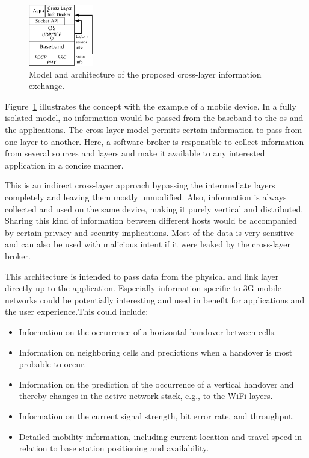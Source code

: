 \begin{figure}[htb]
	\centering
	\includegraphics[width=0.25\textwidth]{images/cross-layer-model.pdf}
	\caption{Model and architecture of the proposed cross-layer information exchange.}
\label{c5:fig:crosslayer-model}
\end{figure}

Figure~\ref{c5:fig:crosslayer-model} illustrates the concept with the example of a mobile device. In a fully isolated model, no information would be passed from the baseband to the \gls{os} and the applications. The cross-layer model permits certain information to pass from one layer to another. Here, a software broker is responsible to collect information from several sources and layers and make it available to any interested application in a concise manner. 

This is an indirect cross-layer approach bypassing the intermediate layers completely and leaving them mostly unmodified. Also, information is always collected and used on the same device, making it purely vertical and distributed. Sharing this kind of information between different hosts would be accompanied by certain privacy and security implications. Most of the data is very sensitive and can also be used with malicious intent if it were leaked by the cross-layer broker.

This architecture is intended to pass data from the physical and link layer directly up to the application. Especially information specific to \gls{3G} mobile networks could be potentially interesting and used in benefit for applications and the user experience.This could include:

\begin{itemize}
	\item Information on the occurrence of a horizontal handover between cells.

	\item Information on neighboring cells and predictions when a handover is most probable to occur.

	\item Information on the prediction of the occurrence of a vertical handover and thereby changes in the active network stack, e.g., to the WiFi layers.

	\item Information on the current signal strength, bit error rate, and throughput.

	\item Detailed mobility information, including current location and travel speed in relation to base station positioning and availability.
\end{itemize}


